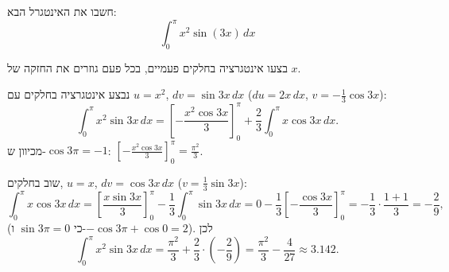 
\begin{question}
חשבו את האינטגרל הבא:
\[ \int_0^\pi x^2\sin(3x)\,dx \]
\end{question}

\begin{hint}
בצעו אינטגרציה בחלקים פעמיים, בכל פעם גוזרים את החזקה של $x$.
\end{hint}

\begin{solution}
נבצע אינטגרציה בחלקים עם $u=x^2$, $dv=\sin3x\,dx$ ($du=2x\,dx$, $v=-\frac13\cos3x$):
\[ \int_0^\pi x^2\sin3x\,dx=\left[-\frac{x^2\cos3x}{3}\right]_0^\pi+\frac23\int_0^\pi x\cos3x\,dx. \]
מכיוון ש-$\cos3\pi=-1$: $\left[-\frac{x^2\cos3x}{3}\right]_0^\pi=\frac{\pi^2}{3}$.

שוב בחלקים, $u=x$, $dv=\cos3x\,dx$ ($v=\frac13\sin3x$):
\[ \int_0^\pi x\cos3x\,dx=\left[\frac{x\sin3x}{3}\right]_0^\pi-\frac13\int_0^\pi\sin3x\,dx=0-\frac13\left[-\frac{\cos3x}{3}\right]_0^\pi=-\frac13\cdot\frac{1+1}{3}=-\frac29, \]
(כי $\sin3\pi=0$ ו-$-\cos3\pi+\cos0=2$). לכן
\[ \int_0^\pi x^2\sin3x\,dx=\frac{\pi^2}{3}+\frac23\cdot\left(-\frac29\right)=\frac{\pi^2}{3}-\frac{4}{27}\approx3.142. \]
\end{solution}
